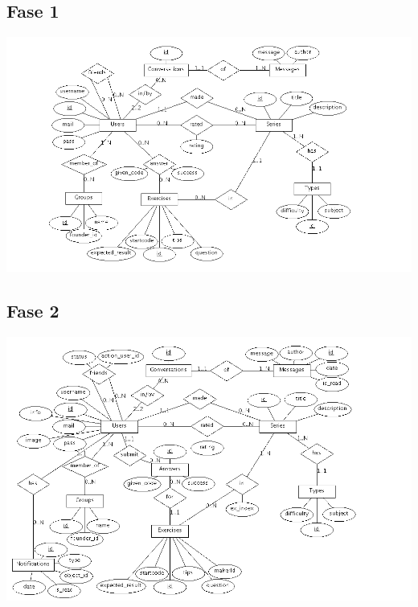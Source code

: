 \subsection{Fase 1}
\mbox{\hspace{-16ex}\includegraphics[keepaspectratio=true, scale=0.6]{raport_files/design/ProjectDatabasesER.png}}
\subsection{Fase 2}
\mbox{\hspace{-16ex}\includegraphics[keepaspectratio=true, scale=0.6]{raport_files/design/ProjectDatabasesER-Fase2.png}}